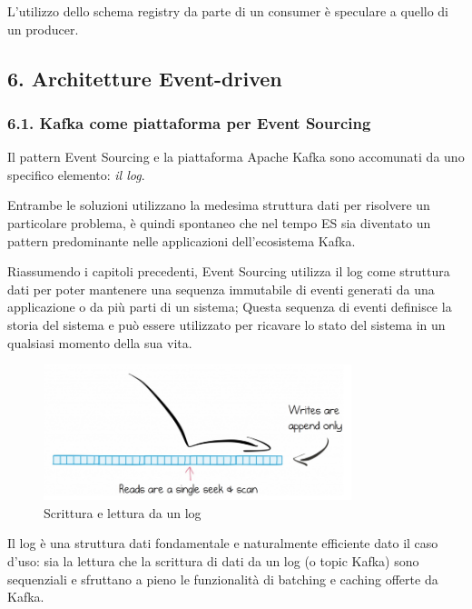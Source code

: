 \documentclass[]{article}
\begin{document}
L'utilizzo dello schema registry da parte di un consumer è speculare a
quello di un producer.

\newpage

\subsection{6. Architetture
Event-driven}\label{architetture-event-driven}

\subsubsection{6.1. Kafka come piattaforma per Event
Sourcing}\label{kafka-come-piattaforma-per-event-sourcing}

Il pattern Event Sourcing e la piattaforma Apache Kafka sono accomunati
da uno specifico elemento: \emph{il log}.

Entrambe le soluzioni utilizzano la medesima struttura dati per
risolvere un particolare problema, è quindi spontaneo che nel tempo ES
sia diventato un pattern predominante nelle applicazioni dell'ecosistema
Kafka.

Riassumendo i capitoli precedenti, Event Sourcing utilizza il log come
struttura dati per poter mantenere una sequenza immutabile di eventi
generati da una applicazione o da più parti di un sistema; Questa
sequenza di eventi definisce la storia del sistema e può essere
utilizzato per ricavare lo stato del sistema in un qualsiasi momento
della sua vita.

\begin{figure}
\centering
\includegraphics[width=0.80000\textwidth]{../images/log-kafka.png}
\caption{Scrittura e lettura da un log \label{figure_5}}
\end{figure}

Il log è una struttura dati fondamentale e naturalmente efficiente dato
il caso d'uso: sia la lettura che la scrittura di dati da un log (o
topic Kafka) sono sequenziali e sfruttano a pieno le funzionalità di
batching e caching offerte da Kafka.
\end{document}
